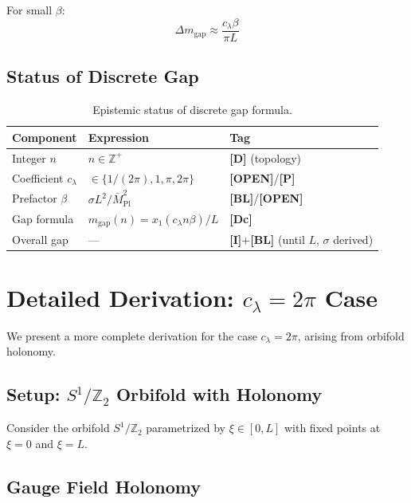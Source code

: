 \documentclass[11pt,a4paper]{article}
\newcommand{\Mpl}{\bar{M}_{\mathrm{Pl}}}
\newcommand{\mgap}{m_{\mathrm{gap}}}
\newcommand{\tagD}{\textbf{[D]}}
\newcommand{\tagDc}{\textbf{[Dc]}}
\newcommand{\tagI}{\textbf{[I]}}
\newcommand{\tagBL}{\textbf{[BL]}}
\newcommand{\tagP}{\textbf{[P]}}
\newcommand{\tagOPEN}{\textbf{[OPEN]}}
\theoremstyle{definition}
\theoremstyle{plain}
\theoremstyle{remark}
\begin{document}
For small $\beta$:
\begin{equation}
\Delta\mgap \approx \frac{c_\lambda\beta}{\pi L}
\label{eq:gap-spacing-small}
\end{equation}

\subsection{Status of Discrete Gap}

\begin{table}[htbp]
\centering
\caption{Epistemic status of discrete gap formula.}
\label{tab:gap-status}
\begin{tabular}{@{}lll@{}}
\toprule
Component & Expression & Tag \\
\midrule
Integer $n$ & $n \in \mathbb{Z}^+$ & \tagD{} (topology) \\
Coefficient $c_\lambda$ & $\in \{1/(2\pi), 1, \pi, 2\pi\}$ & \tagOPEN{}/\tagP{} \\
Prefactor $\beta$ & $\sigma L^2/\Mpl^2$ & \tagBL{}/\tagOPEN{} \\
Gap formula & $\mgap(n) = x_1(c_\lambda n\beta)/L$ & \tagDc{} \\
\midrule
Overall gap & --- & \tagI{}+\tagBL{} (until $L$, $\sigma$ derived) \\
\bottomrule
\end{tabular}
\end{table}

\section{Detailed Derivation: $c_\lambda = 2\pi$ Case}
\label{sec:2pi-case}

We present a more complete derivation for the case $c_\lambda = 2\pi$, arising
from orbifold holonomy.

\subsection{Setup: $S^1/\mathbb{Z}_2$ Orbifold with Holonomy}

Consider the orbifold $S^1/\mathbb{Z}_2$ parametrized by $\xi \in [0, L]$ with
fixed points at $\xi = 0$ and $\xi = L$.

\subsection{Gauge Field Holonomy}
\end{document}
